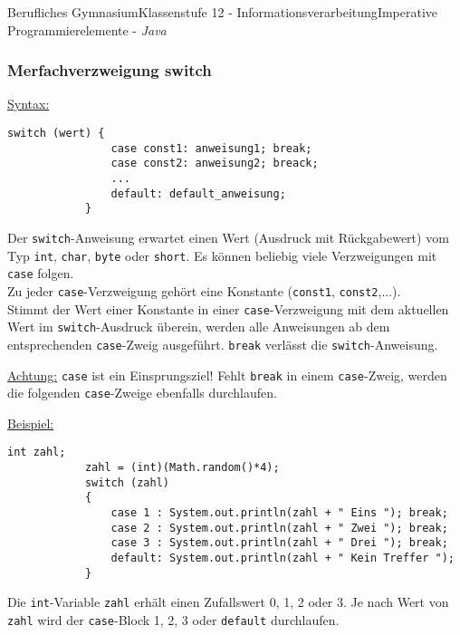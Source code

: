 \documentclass[oneside,openany,headings=optiontotoc,11pt,numbers=noenddot]{article}
\begin{document}
\begin{worksheet}{Berufliches Gymnasium}{Klassenstufe 12 - Informationsverarbeitung}{Imperative Programmierelemente - \textit{Java}}
		\subsubsection{Merfachverzweigung switch}
		\underline{Syntax:}
		\begin{lstlisting}[style=JavaInputStyle]
			switch (wert) {
				case const1: anweisung1; break;
				case const2: anweisung2; breack;
				...
				default: default_anweisung;
			}
		\end{lstlisting}
		Der \lstinline[style=JavaInputStyle]|switch|-Anweisung erwartet einen Wert (Ausdruck mit Rückgabewert) vom Typ \lstinline[style=JavaInputStyle]|int|, \lstinline[style=JavaInputStyle]|char|, \lstinline[style=JavaInputStyle]|byte| oder \lstinline[style=JavaInputStyle]|short|. Es können beliebig viele Verzweigungen mit \lstinline[style=JavaInputStyle]|case| folgen.\\
		Zu jeder \lstinline[style=JavaInputStyle]|case|-Verzweigung gehört eine Konstante (\lstinline[style=JavaInputStyle]|const1|, \lstinline[style=JavaInputStyle]|const2|,...).\\
		Stimmt der Wert einer Konstante in einer \lstinline[style=JavaInputStyle]|case|-Verzweigung mit dem aktuellen Wert im \lstinline[style=JavaInputStyle]|switch|-Ausdruck überein, werden alle Anweisungen ab dem entsprechenden \lstinline[style=JavaInputStyle]|case|-Zweig ausgeführt. \lstinline[style=JavaInputStyle]|break| verlässt die \lstinline[style=JavaInputStyle]|switch|-Anweisung.\\
		\par\noindent
		\underline{Achtung:} \lstinline[style=JavaInputStyle]|case| ist ein Einsprungsziel! Fehlt \lstinline[style=JavaInputStyle]|break| in einem \lstinline[style=JavaInputStyle]|case|-Zweig, werden die folgenden \lstinline[style=JavaInputStyle]|case|-Zweige ebenfalls durchlaufen.\\
		\par\noindent
		\underline{Beispiel:}
		\begin{lstlisting}[style=JavaInputStyle]
			int zahl;
			zahl = (int)(Math.random()*4);
			switch (zahl)
			{
				case 1 : System.out.println(zahl + " Eins "); break;
				case 2 : System.out.println(zahl + " Zwei "); break;
				case 3 : System.out.println(zahl + " Drei "); break;
				default: System.out.println(zahl + " Kein Treffer ");
			}
		\end{lstlisting}
		Die \lstinline[style=JavaInputStyle]|int|-Variable \lstinline[style=JavaInputStyle]|zahl| erhält einen Zufallswert 0, 1, 2 oder 3. Je nach Wert von \lstinline[style=JavaInputStyle]|zahl| wird der \lstinline[style=JavaInputStyle]|case|-Block 1, 2, 3 oder \lstinline[style=JavaInputStyle]|default| durchlaufen.\\

\end{worksheet}
\end{document}
